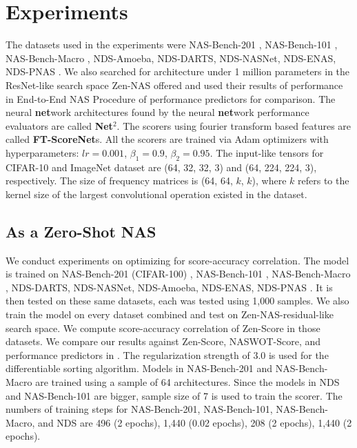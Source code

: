 \documentclass[lettersize,journal]{IEEEtran}
\begin{document}
\section{Experiments} \label{sec:experiment}
The datasets used in the experiments were NAS-Bench-201 \cite{nb201}, NAS-Bench-101 \cite{nb101}, NAS-Bench-Macro \cite{macro}, NDS-Amoeba, NDS-DARTS, NDS-NASNet, NDS-ENAS, NDS-PNAS \cite{nds}. We also searched for architecture under 1 million parameters in the ResNet-like search space Zen-NAS \cite{Zen-NAS} offered and used their results of performance in End-to-End NAS Procedure of performance predictors for comparison. The neural \textbf{net}work architectures found by the neural \textbf{net}work performance evaluators are called \textbf{Net$^{2}$}. The scorers using fourier transform based features are called \textbf{FT-ScoreNet}s. All the scorers are trained via Adam optimizers with hyperparameters: $lr = 0.001$, $\beta_1 = 0.9$, $\beta_2 = 0.95$. The input-like tensors for CIFAR-10 and ImageNet dataset are (64, 32, 32, 3) and (64, 224, 224, 3), respectively. The size of frequency matrices is (64, 64, $k$, $k$), where $k$ refers to the kernel size of the largest convolutional operation existed in the dataset.

    \subsection{As a Zero-Shot NAS}
        We conduct experiments on optimizing for score-accuracy correlation. The model is trained on NAS-Bench-201 (CIFAR-100) \cite{nb201}, NAS-Bench-101 \cite{nb101}, NAS-Bench-Macro \cite{macro}, NDS-DARTS, NDS-NASNet, NDS-Amoeba, NDS-ENAS, NDS-PNAS \cite{nds}. It is then tested on these same datasets, each was tested using 1,000 samples. We also train the model on every dataset combined and test on Zen-NAS-residual-like search space. We compute score-accuracy correlation of Zen-Score in those datasets. We compare our results against Zen-Score, NASWOT-Score, and performance predictors in \cite{LightweightNAS}. The regularization strength of 3.0 is used for the differentiable sorting algorithm. Models in NAS-Bench-201 and NAS-Bench-Macro are trained using a sample of 64 architectures. Since the models in NDS and NAS-Bench-101 are bigger, sample size of 7 is used to train the scorer. The numbers of training steps for NAS-Bench-201, NAS-Bench-101, NAS-Bench-Macro, and NDS are 496 (2 epochs), 1,440 (0.02 epochs), 208 (2 epochs), 1,440 (2 epochs).
\end{document}
